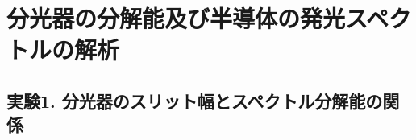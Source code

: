 \documentclass[11pt,a4j]{jsarticle}
\begin{document}
\newpage


\newpage
\section{分光器の分解能及び半導体の発光スペクトルの解析}
\subsection{実験1. 分光器のスリット幅とスペクトル分解能の関係}
\end{document}
